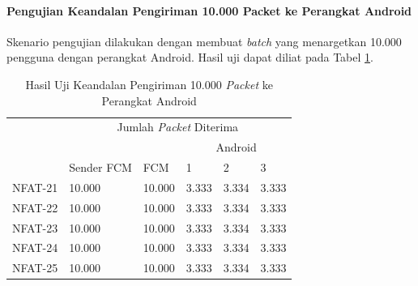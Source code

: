 \paragraph{Pengujian Keandalan Pengiriman 10.000 Packet ke Perangkat Android}
\par Skenario pengujian dilakukan dengan membuat \textit{batch} yang menargetkan 10.000 pengguna dengan perangkat Android. Hasil uji dapat diliat pada Tabel \ref{t:keandalan-android-10k}.
\clearpage
\begin{longtable}{|p{1.5cm}|p{2cm}|p{1.5cm}|p{1cm}|p{1cm}|p{1cm}|}
	\caption{Hasil Uji Keandalan Pengiriman 10.000 \textit{Packet} ke Perangkat Android} \label{t:keandalan-android-10k} \\ \hline
	\rowcolor{lightgray} & \multicolumn{5}{c|}{Jumlah \textit{Packet} Diterima} \\ \hhline{~|*5{-}|}
	\rowcolor{lightgray} & & & \multicolumn{3}{c|}{Android} \\ \hhline{~~~|*3{-}|}
	\rowcolor{lightgray} \multirow{-3}{*}{Kode} & \multirow{-2}{*}{Sender FCM} & \multirow{-2}{*}{FCM} & 1 & 2 & 3 \\ \hline
	NFAT-21 & 10.000 & 10.000 & 3.333 & 3.334 & 3.333 \\ \hline
	NFAT-22 & 10.000 & 10.000 & 3.333 & 3.334 & 3.333 \\ \hline
	NFAT-23 & 10.000 & 10.000 & 3.333 & 3.334 & 3.333 \\ \hline
	NFAT-24 & 10.000 & 10.000 & 3.333 & 3.334 & 3.333 \\ \hline
	NFAT-25 & 10.000 & 10.000 & 3.333 & 3.334 & 3.333 \\ \hline
\end{longtable}

